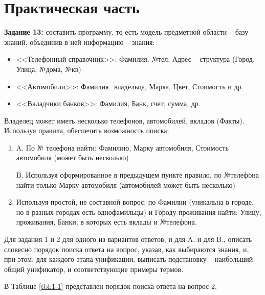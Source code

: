 \chapter{Практическая часть}

\textbf{Задание 13:} составить программу, то есть модель предметной области – базу знаний, объединив в ней информацию – знания:

\begin{itemize}
    \item <<Телефонный справочник>>: Фамилия, №тел, Адрес – структура (Город, Улица, №дома, №кв)
    \item <<Автомобили>>: Фамилия\_владельца, Марка, Цвет, Стоимость и др.
    \item <<Вкладчики банков>>: Фамилия, Банк, счет, сумма, др.
\end{itemize}

Владелец может иметь несколько телефонов, автомобилей, вкладов (Факты).
Используя правила, обеспечить возможность поиска:


\begin{enumerate}
    \item A. По № телефона найти: Фамилию, Марку автомобиля, Стоимость автомобиля (может быть несколько)

        B. Используя сформированное в предыдущем пункте правило, по №телефона найти только Марку автомобиля (автомобилей может быть несколько)

    \item Используя простой, не составной вопрос: по Фамилии (уникальна в городе, но в разных городах есть однофамильцы) и Городу проживания найти: Улицу, проживания, Банки, в которых есть вклады и №телефона.
\end{enumerate}

Для задания 1 и 2 для одного из вариантов ответов, и для A. и для B., описать словесно порядок поиска ответа на вопрос, указав, как выбираются знания, и, при этом, для каждого этапа унификации, выписать подстановку – наибольший общий унификатор, и соответствующие примеры термов.


\clearpage


В Таблице \ref{tbl:1-1} представлен порядок поиска ответа на вопрос 2.


